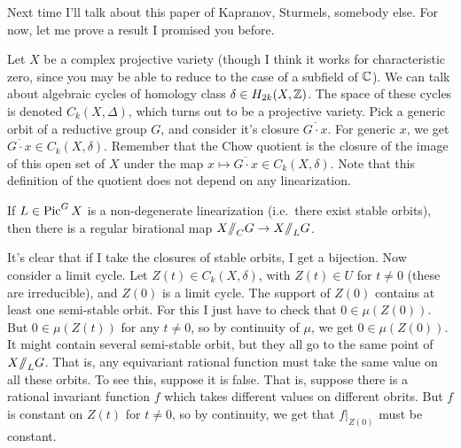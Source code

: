Next time I'll talk about this paper of Kapranov, Sturmels, somebody else. For now, let me prove a result I promised you before.

Let $X$ be a complex projective variety (though I think it works for characteristic zero, since you may be able to reduce to the case of a subfield of $\mathbb{C}$). We can talk about algebraic cycles of homology class $\delta\in H_{2k}(X,\mathbb{Z})$. The space of these cycles is denoted $C_k(X,\Delta)$, which turns out to be a projective variety. Pick a generic orbit of a reductive group $G$, and consider it's closure $\overline{G\cdot x}$. For generic $x$, we get $\overline{G\cdot x}\in C_k(X,\delta)$. Remember that the Chow quotient is the closure of the image of this open set of $X$ under the map $x\mapsto \overline{G\cdot x}\in C_k(X,\delta)$. Note that this definition of the quotient does not depend on any linearization.
\begin{theorem}
 If $L\in \operatorname{Pic}^GX$ is a non-degenerate linearization (i.e.~there exist stable orbits), then there is a regular birational map $X\mbox{\rm /\!\!/}_C G\to X\mbox{\rm /\!\!/}_L G$.
\end{theorem}
It's clear that if I take the closures of stable orbits, I get a bijection. Now consider a limit cycle. Let $Z(t)\in C_k(X,\delta)$, with $Z(t)\in U$ for $t\neq 0$ (these are irreducible), and $Z(0)$ is a limit cycle.  The support of $Z(0)$ contains at least one semi-stable orbit. For this I just have to check that $0\in\mu(Z(0))$. But $0\in \mu(Z(t))$ for any $t\neq 0$, so by continuity of $\mu$, we get $0\in \mu(Z(0))$. It might contain several semi-stable orbit, but they all go to the same point of $X\mbox{\rm /\!\!/}_L G$. That is, any equivariant rational function must take the same value on all these orbits. To see this, suppose it is false. That is, suppose there is a rational invariant function $f$ which takes different values on different obrits. But $f$ is constant on $Z(t)$ for $t\neq 0$, so by continuity, we get that $f|_{Z(0)}$ must be constant.